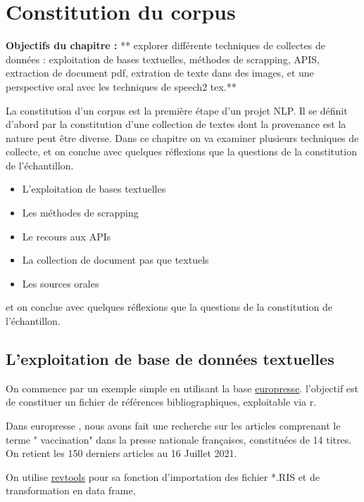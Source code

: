 \documentclass[
]{book}
\providecommand{\tightlist}{%
  \setlength{\itemsep}{0pt}\setlength{\parskip}{0pt}}
\begin{document}
\hypertarget{constitution-du-corpus}{%
\chapter{Constitution du corpus}\label{constitution-du-corpus}}

\textbf{Objectifs du chapitre : } ** explorer différente techniques de collectes de données : exploitation de bases textuelles, méthodes de scrapping, APIS, extraction de document pdf, extration de texte dans des images, et une perspective oral avec les techniques de speech2 tex.**

La constitution d'un corpus est la première étape d'un projet NLP. Il se définit d'abord par la constitution d'une collection de textes dont la provenance est la nature peut être diverse. Dans ce chapitre on va examiner plusieurs techniques de collecte, et on conclue avec quelques réflexions que la questions de la constitution de l'échantillon.

\begin{itemize}
\tightlist
\item
  L'exploitation de bases textuelles
\item
  Les méthodes de scrapping
\item
  Le recours aux APIs
\item
  La collection de document pas que textuels
\item
  Les sources orales
\end{itemize}

et on conclue avec quelques réflexions que la questions de la constitution de l'échantillon.

\hypertarget{lexploitation-de-base-de-donnuxe9es-textuelles}{%
\section{L'exploitation de base de données textuelles}\label{lexploitation-de-base-de-donnuxe9es-textuelles}}

On commence par un exemple simple en utilisant la base \href{http://www.europresse.com/fr/}{europresse}. l'objectif est de constituer un fichier de références bibliographiques, exploitable via r.

Dans europresse , nous avons fait une recherche sur les articles comprenant le terme " vaccination" dans la presse nationale françaises, constituées de 14 titres. On retient les 150 derniers articles au 16 Juillet 2021.

On utilise \href{https://revtools.net/data.html\#importing-to-r}{revtools} pour sa fonction d'importation des fichier *.RIS et de transformation en data frame,
\end{document}
